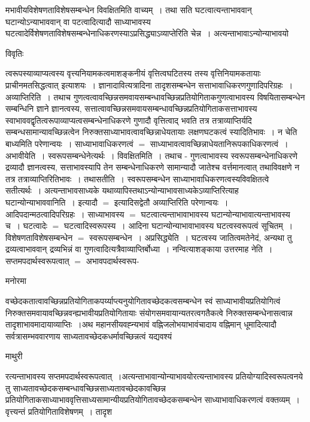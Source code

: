 \documentclass[10pt, openany]{book}
\begin{document}
{{\la मभावीयविशेषणताविशेषसम्बन्धेन विवक्षितमिति वाच्यम्~। तथा  सति घटत्वात्यन्ताभाववान् घटान्योऽन्याभाववान् वा पटत्वादित्यादौ साध्याभावस्य घटत्वादेर्विशेषणताविशेषसम्बन्धेनाधिकरणस्याऽप्रसिद्ध्याऽव्याप्तेरिति चेन्न~। अत्यन्ताभावाऽन्योन्याभावयो}
\begin{center}     विवृतिः \end{center}
त्वरूपस्याव्याप्यत्वस्य वृत्त्यनियामकत्वमाशङ्कनीयं वृत्तित्वघटितस्य तस्य वृत्तिनियामकतायाः प्राचीनमतसिद्धत्वात् इत्याशयः~। ज्ञानादावित्यत्रादिना तादृशसम्बन्धेन सत्ताभावाधिकरणगुणादिपरिग्रहः~। {\la अव्याप्तिरिति~।} तथाच गुणत्वत्वावच्छिन्नसमवायसम्बन्धावच्छिन्नप्रतियोगिताकगुणत्वाभावस्य विषयितासम्बन्धेन सम्बन्धिनि ज्ञाने ज्ञानत्वस्य, सत्तात्वावच्छिन्नसमवायसम्बन्धावच्छिन्नप्रतियोगिताकसत्ताभावस्य स्वाभाववद्वृतित्वरूपाव्याप्यत्वसम्बन्धेनाधिकरणे गुणादौ वृत्तित्वाद् भवति तत्र तत्राव्याप्तिर्यदि सम्बन्धसामान्यावच्छिन्नत्वेन  निरुक्तसाध्याभावत्वावच्छिन्नाधेयतायाः लक्षणघटकत्वं स्यादितिभावः~। न चेति बाध्यमिति परेणान्वयः~। साध्याभावाधिकरणत्वं $=$ साध्याभावत्वावच्छिन्नाधेयतानिरूपकाधिकरणत्वं~। अभावीयेति~। स्वरूपसम्बन्धेनेत्यर्थः~। विवक्षितमिति~। तथाच - गुणत्वाभावस्य स्वरूपसम्बन्धेनाधिकरणे द्रव्यादौ ज्ञानत्वस्य, सत्ताभावस्यापि तेन सम्बन्धेनाधिकरणे सामान्यादौ जातेश्च वर्त्तमानत्वात् तथाविवक्षणे न तत्र तत्राव्याप्तिरितिभावः~। तथासतीति~। स्वरूपसम्बन्धेन
साध्याभावाधिकरणत्वस्यविवक्षितत्वे सतीत्यर्थः~। अत्यन्ताभावसाध्यके यथाव्यापिस्तथाऽन्योन्याभावसाध्यकेऽव्याप्तिरित्याह घटान्योन्याभाववानिति~। इत्यादौ $=$ इत्यादिसद्वेतौ अव्याप्तिरिति परेणान्वयः~। आदिपदान्मठत्वादिपरिग्रहः~। साध्याभावस्य $=$ घटत्वात्यन्ताभावाभावस्य घटान्योन्याभावात्यन्ताभावस्य च~। घटत्वादेः $=$ घटत्वादिस्वरूपस्य~। आदिना घटान्योन्याभावाभावस्य घटत्वस्वरूपत्वं सूचितम्~। विशेषणताविशेषसम्बन्धेन $=$ स्वरूपसम्बन्धेन~। अप्रसिद्ध्येति~। घटत्वस्य जातित्वमतेनेदं, अन्यथा तु द्रव्यत्वाभाववान् द्रव्यभिन्नं वा गुणत्वादित्यत्रैवाव्याप्तिर्बोध्या~। नन्वित्याशङ्काया उत्तरमाह नेति~। सप्तमपदार्थस्वरूपत्वात् $=$ अभावपदार्थस्वरूप-
\begin{center}   मनोरमा  \end{center}
वच्छेदकतात्वावच्छिन्नप्रतियोगिताकपर्य्याप्त्यनुयोगितावच्छेदकत्वसम्बन्धेन स्वं साध्याभावीयप्रतियोगित्वं निरुक्तसमवायावच्छिन्नवन्ह्यभावीयप्रतियोगितायाः संयोगसमवायान्यतरत्वगतैकत्वे निरुक्तसम्बन्धेनासत्वान्न तादृशाभावमादायाव्याप्तिः~।\noindent अथ महानसीयवह्न्यभावं वह्निजलोभयाभावंचादाय वह्निमान् धूमादित्यादौ सर्वत्रासम्भववारणाय साध्यतावच्छेदकधर्मावच्छिन्नत्वं यद्यवश्यं
\newpage
\begin{center}  माथुरी  \end{center}
{\la रत्यन्ताभावस्य सप्तमपदार्थस्वरूपत्वात्~।अत्यन्ताभावान्योन्याभावयोरत्यन्ताभावस्य प्रतियोग्यादिस्वरूपत्वनये तु साध्यतावच्छेदकसम्बन्धावच्छिन्नसाध्यतावच्छेदकावच्छिन्न प्रतियोगिताकसाध्याभाववृत्तिसाध्यसामान्यीयप्रतियोगितावच्छेदकसम्बन्धेन साध्याभावाधिकरणत्वं वक्तव्यम्~। वृत्त्यन्तं प्रतियोगिताविशेषणम्~। तादृश}
}
\end{document}
